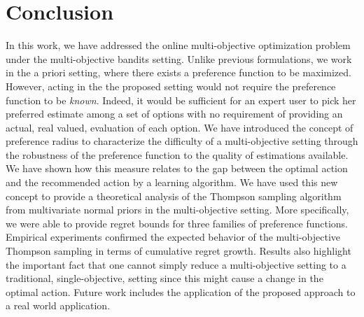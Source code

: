 
\section{Conclusion}
\label{sec:conclusion}

In this work, we have addressed the online multi-objective optimization problem under the multi-objective bandits setting. Unlike previous formulations, we work in the a priori setting, where there exists a preference function to be maximized. However, acting in the the proposed setting would not require the preference function to be \emph{known}. Indeed, it would be sufficient for an expert user to pick her preferred estimate among a set of options with no requirement of providing an actual, real valued, evaluation of each option. We have introduced the concept of preference radius to characterize the difficulty of a multi-objective setting through the robustness of the preference function to the quality of estimations available. We have shown how this measure relates to the gap between the optimal action and the recommended action by a learning algorithm. We have used this new concept to provide a theoretical analysis of the Thompson sampling algorithm from multivariate normal priors in the multi-objective setting. More specifically, we were able to provide regret bounds for three families of preference functions. Empirical experiments confirmed the expected behavior of the multi-objective Thompson sampling in terms of cumulative regret growth. Results also highlight the important fact that one cannot simply reduce a multi-objective setting to a traditional, single-objective, setting since this might cause a change in the optimal action. Future work includes the application of the proposed approach to a real world application.